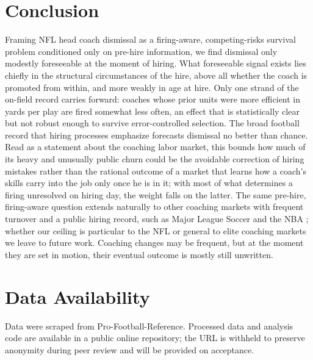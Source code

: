 \documentclass[12pt,USenglish]{article}
\begin{document}
\section{Conclusion}

Framing NFL head coach dismissal as a firing-aware, competing-risks survival problem conditioned only on pre-hire information, we find dismissal only modestly foreseeable at the moment of hiring. What foreseeable signal exists lies chiefly in the structural circumstances of the hire, above all whether the coach is promoted from within, and more weakly in age at hire. Only one strand of the on-field record carries forward: coaches whose prior units were more efficient in yards per play are fired somewhat less often, an effect that is statistically clear but not robust enough to survive error-controlled selection. The broad football record that hiring processes emphasize forecasts dismissal no better than chance. Read as a statement about the coaching labor market, this bounds how much of its heavy and unusually public churn could be the avoidable correction of hiring mistakes rather than the rational outcome of a market that learns how a coach's skills carry into the job only once he is in it; with most of what determines a firing unresolved on hiring day, the weight falls on the latter. The same pre-hire, firing-aware question extends naturally to other coaching markets with frequent turnover and a public hiring record, such as Major League Soccer and the NBA \citep{gilfix2020}; whether our ceiling is particular to the NFL or general to elite coaching markets we leave to future work. Coaching changes may be frequent, but at the moment they are set in motion, their eventual outcome is mostly still unwritten.

\section*{Data Availability}
Data were scraped from Pro-Football-Reference. Processed data and analysis code are available in a public online repository; the URL is withheld to preserve anonymity during peer review and will be provided on acceptance.



\end{document}

